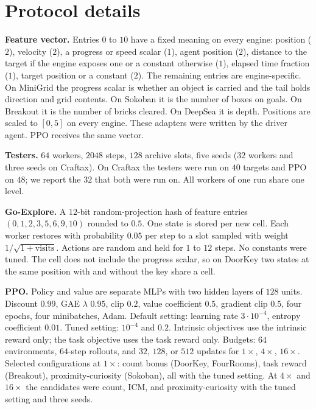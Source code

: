\documentclass{article}
\begin{document}
\section{Protocol details}
\label{app:protocol}
\textbf{Feature vector.} Entries $0$ to $10$ have a fixed meaning on every engine: position ($2$), velocity ($2$), a
progress or speed scalar ($1$), agent position ($2$), distance to the target if the engine exposes one or a constant
otherwise ($1$), elapsed time fraction ($1$), target position or a constant ($2$). The remaining entries are
engine-specific. On MiniGrid the progress scalar is whether an object is carried and the tail holds direction and grid
contents. On Sokoban it is the number of boxes on goals. On Breakout it is the number of bricks cleared. On DeepSea it is
depth. Positions are scaled to $[0,5]$ on every engine. These adapters were written by the driver agent. PPO receives the
same vector.

\textbf{Testers.} $64$ workers, $2048$ steps, $128$ archive slots, five seeds ($32$ workers and three seeds on Craftax). On
Craftax the testers were run on $40$ targets and PPO on $48$; we report the $32$ that both were run on.
All workers of one run share one level.

\textbf{Go-Explore.} A $12$-bit random-projection hash of feature entries $(0,1,2,3,5,6,9,10)$ rounded to $0.5$. One state
is stored per new cell. Each worker restores with probability $0.05$ per step to a slot sampled with weight
$1/\sqrt{1+\text{visits}}$. Actions are random and held for $1$ to $12$ steps. No constants were tuned. The cell does not
include the progress scalar, so on DoorKey two states at the same position with and without the key share a cell.

\textbf{PPO.} Policy and value are separate MLPs with two hidden layers of $128$ units. Discount $0.99$, GAE $\lambda$
$0.95$, clip $0.2$, value coefficient $0.5$, gradient clip $0.5$, four epochs, four minibatches, Adam. Default setting:
learning rate $3\cdot10^{-4}$, entropy coefficient $0.01$. Tuned setting: $10^{-4}$ and $0.2$. Intrinsic objectives use
the intrinsic reward only; the task objective uses the task reward only. Budgets: $64$ environments, $64$-step rollouts,
and $32$, $128$, or $512$ updates for $1\times$, $4\times$, $16\times$. Selected configurations at $1\times$: count bonus
(DoorKey, FourRooms), task reward (Breakout), proximity-curiosity (Sokoban), all with the tuned setting. At $4\times$ and
$16\times$ the candidates were count, ICM, and proximity-curiosity with the tuned setting and three seeds.
\end{document}
